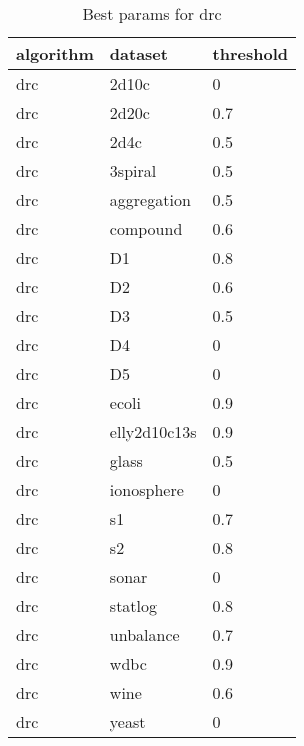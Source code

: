 \begin{table}[H]
\centering
\caption{Best params for drc}
\label{tab:params:drc}
\begin{tabular}{|l|l|l|}
\hline
algorithm & dataset & threshold \\
\hline
drc & 2d10c & 0 \\
\hline
drc & 2d20c & 0.7 \\
\hline
drc & 2d4c & 0.5 \\
\hline
drc & 3spiral & 0.5 \\
\hline
drc & aggregation & 0.5 \\
\hline
drc & compound & 0.6 \\
\hline
drc & D1 & 0.8 \\
\hline
drc & D2 & 0.6 \\
\hline
drc & D3 & 0.5 \\
\hline
drc & D4 & 0 \\
\hline
drc & D5 & 0 \\
\hline
drc & ecoli & 0.9 \\
\hline
drc & elly2d10c13s & 0.9 \\
\hline
drc & glass & 0.5 \\
\hline
drc & ionosphere & 0 \\
\hline
drc & s1 & 0.7 \\
\hline
drc & s2 & 0.8 \\
\hline
drc & sonar & 0 \\
\hline
drc & statlog & 0.8 \\
\hline
drc & unbalance & 0.7 \\
\hline
drc & wdbc & 0.9 \\
\hline
drc & wine & 0.6 \\
\hline
drc & yeast & 0 \\
\hline
\end{tabular}
\end{table}
